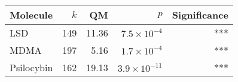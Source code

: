 \begin{tabular}{lrrrr}
  \toprule
  Molecule & $k$ & QM & $p$ & Significance \\
  \midrule
  LSD & 149 & 11.36 & $7.5\times 10^{-4}$ & *** \\
  MDMA & 197 & 5.16 & $1.7\times 10^{-4}$ & *** \\
  Psilocybin & 162 & 19.13 & $3.9\times 10^{-11}$ & *** \\
  \bottomrule
\end{tabular}
